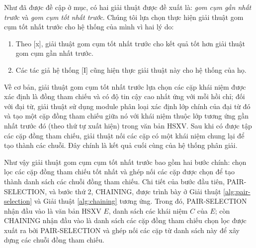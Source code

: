 Như đã được đề cập ở mục, có hai giải thuật được đề xuất là: \emph{gom cụm gần nhất trước} và \emph{gom cụm tốt nhất trước}. Chúng tôi lựa chọn thực hiện giải thuật gom cụm tốt nhất trước cho hệ thống của mình vì hai lý do:
\begin{enumerate}[leftmargin=\the\parindent]
\item Theo [x], giải thuật gom cụm tốt nhất trước cho kết quả tốt hơn giải thuật gom cụm gần nhất trước.
\item Các tác giả hệ thống [I] cũng hiện thực giải thuật này cho hệ thống của họ.
\end{enumerate}

Về cơ bản, giải thuật gom cụm tốt nhất trước lựa chọn các cặp khái niệm được xác định là đồng tham chiếu và có độ tin cậy cao nhất ứng với mỗi hồi chỉ; đối với đại từ, giải thuật sử dụng module phân loại xác định lớp chính của đại từ đó và tạo một cặp đồng tham chiếu giữa nó với khái niệm thuộc lớp tương ứng gần nhất trước đó (theo thứ tự xuất hiện) trong văn bản HSXV. Sau khi có được tập các cặp đồng tham chiếu, giải thuật nối các cặp có một khái niệm chung lại để tạo thành các chuỗi. Đây chính là kết quả cuối cùng của hệ thống phân giải.

Như vậy giải thuật gom cụm cụm tốt nhất trước bao gồm hai bước chính: chọn lọc các cặp đồng tham chiếu tốt nhất và ghép nối các cặp được chọn để tạo thành danh sách các chuỗi đồng tham chiếu. Chi tiết của bước đầu tiên, PAIR-SELECTION, và bước thứ 2, CHAINING, được trình bày ở Giải thuật \ref{alg:pair-selection} và Giải thuật \ref{alg:chaining} tương ứng. Trong đó, PAIR-SELECTION nhận đầu vào là văn bản HSXV $E$, danh sách các khái niệm $C$ của $E$; còn CHAINING nhận đầu vào là danh sách các cặp đồng tham chiếu chọn lọc được xuất ra bởi PAIR-SELECTION và ghép nối các cặp từ danh sách này để xây dựng các chuỗi đồng tham chiếu.

